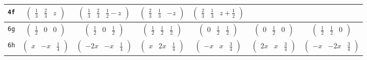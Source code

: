 \documentclass[fleqn,9pt,landscape]{jsarticle}
\begin{document}
\begin{center}
\begin{longtable}{ccccccc}
{\tt 4f} & $ \begin{pmatrix} \frac{1}{3} & \frac{2}{3} & z \end{pmatrix} $ & $ \begin{pmatrix} \frac{1}{3} & \frac{2}{3} & \frac{1}{2} - z \end{pmatrix} $ & $ \begin{pmatrix} \frac{2}{3} & \frac{1}{3} & - z \end{pmatrix} $ & $ \begin{pmatrix} \frac{2}{3} & \frac{1}{3} & z + \frac{1}{2} \end{pmatrix} $ & $  $ & $  $ \\ \hline
{\tt 6g} & $ \begin{pmatrix} \frac{1}{2} & 0 & 0 \end{pmatrix} $ & $ \begin{pmatrix} \frac{1}{2} & 0 & \frac{1}{2} \end{pmatrix} $ & $ \begin{pmatrix} \frac{1}{2} & \frac{1}{2} & \frac{1}{2} \end{pmatrix} $ & $ \begin{pmatrix} 0 & \frac{1}{2} & \frac{1}{2} \end{pmatrix} $ & $ \begin{pmatrix} 0 & \frac{1}{2} & 0 \end{pmatrix} $ & $ \begin{pmatrix} \frac{1}{2} & \frac{1}{2} & 0 \end{pmatrix} $ \\ \hline
{\tt 6h} & $ \begin{pmatrix} x & - x & \frac{1}{4} \end{pmatrix} $ & $ \begin{pmatrix} - 2 x & - x & \frac{1}{4} \end{pmatrix} $ & $ \begin{pmatrix} x & 2 x & \frac{1}{4} \end{pmatrix} $ & $ \begin{pmatrix} - x & x & \frac{3}{4} \end{pmatrix} $ & $ \begin{pmatrix} 2 x & x & \frac{3}{4} \end{pmatrix} $ & $ \begin{pmatrix} - x & - 2 x & \frac{3}{4} \end{pmatrix} $ \\ \hline

\end{longtable}
\end{center}
\end{document}
